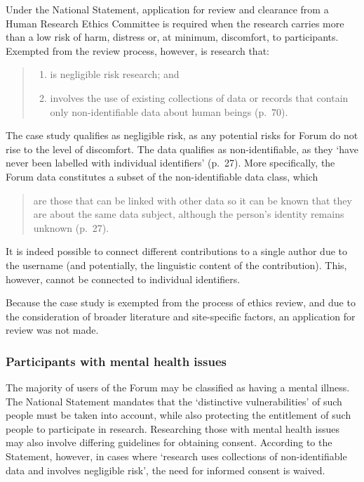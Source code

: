 Under the National Statement, application for review and clearance from a Human Research Ethics Committee is required when the research carries more than a low risk of harm, distress or, at minimum, discomfort, to participants. Exempted from the review process, however, is research that:

\begin{quote}
\small \singlespacing
\begin{enumerate}
    \item is negligible risk research; and
    \item involves the use of existing collections of data or records that contain only non\hyp{}identifiable data about human beings (p.~70).
\end{enumerate}
\end{quote}
%
The case study qualifies as negligible risk, as any potential risks for \gls{Forum}  do not rise to the level of discomfort. The data qualifies as non\hyp{}identifiable, as they `have never been labelled with individual identifiers' (p.~27). More specifically, the \gls{Forum} data constitutes a subset of the non\hyp{}identifiable data class, which 

\begin{quote}
\small \singlespacing
are those that can be linked with other data so it can be known that they are about the same data subject, although the person's identity remains unknown (p.~27).
\end{quote}
%
It is indeed possible to connect different contributions to a single author due to the username (and potentially, the linguistic content of the contribution). This, however, cannot be connected to individual identifiers.

Because the case study is exempted from the process of ethics review, and due to the consideration of broader literature and site\hyp{}specific factors, an application for review was not made.

\subsubsection{Participants with mental health issues}

The majority of users of the \gls{Forum} may be classified as having a mental illness. The National Statement mandates that the `distinctive vulnerabilities' of such people must be taken into account, while also protecting the entitlement of such people to participate in research. Researching those with mental health issues may also involve differing guidelines for obtaining consent. According to the Statement, however, in cases where `research uses collections of non\hyp{}identifiable data and involves negligible risk', the need for informed consent is waived.

